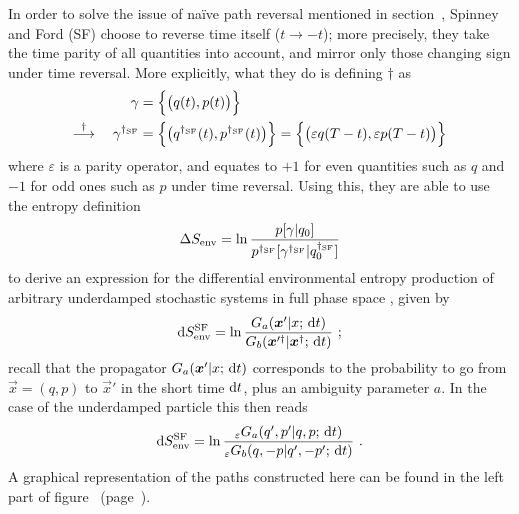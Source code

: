 In order to solve the issue of na\"ive path reversal mentioned in section~, Spinney and Ford (SF) \cite{sf} choose to reverse time itself (\(t\to-t\)); more precisely, they take the time parity of all quantities into account, and mirror only those changing sign under time reversal. More explicitly, what they do is defining \(\dagger\) as \cite{sf-odd-even}
%
\begin{equation}\begin{split}
	\gamma &= \Bigl\{\bigl(q(t),p(t)\bigr)\Bigr\}
	\\ \overset\dagger\longrightarrow \quad
	\gamma^{\dagger_{\text{SF}}}
		&= \Bigl\{\bigl(q^{\dagger_{\text{SF}}}(t),p^{\dagger_{\text{SF}}}(t)\bigr)\Bigr\}
		= \Bigl\{\bigl(\varepsilon q(T-t),\varepsilon p(T-t)\bigr)\Bigr\}
\end{split}\end{equation}
%
where \(\varepsilon\) is a parity operator, and equates to \(+1\) for even quantities such as \(q\) and \(-1\) for odd ones such as \(p\) under time reversal. Using this, they are able to use the entropy definition
%
\begin{equation}
	\Delta S_\text{env} = \ln\frac{p[\gamma | q_0]}{p^{\dagger_{\text{SF}}}[\gamma^{\dagger_{\text{SF}}} | q_0^{\dagger_{\text{SF}}}]}
\end{equation}
%
to derive an expression for the differential environmental entropy production of arbitrary underdamped stochastic systems in full phase space \cite{sf}, given by
%
\begin{equation}
	\mathrm{d}S_\text{env}^{\text{SF}} = \ln \frac{G_a(\boldsymbol{x}'|x;\,\mathrm{d} t)}{G_b(\boldsymbol{x}'^\dagger|\boldsymbol{x}^\dagger;\,\mathrm{d} t)} ~;
\end{equation}
%
recall that the propagator \(G_a(\boldsymbol{x}'|x;\,\mathrm{d} t)\) corresponds to the probability to go from \(\vec x = (q,p)\) to \(\vec x'\) in the short time \(\mathrm{d} t\), plus an ambiguity parameter \(a\). In the case of the underdamped particle  this then reads
%
\begin{equation}
	\label{eqn:DSEnv spinney main definition}
	\mathrm{d}S_\text{env}^{\text{SF}} =
		\ln \frac
			{_\varepsilon G_a(q',p'|q,p;\,\mathrm{d} t)}
			{_\varepsilon G_b(q,-p|q',-p';\,\mathrm{d} t)} ~.
\end{equation}
%
A graphical representation of the paths constructed here can be found in the left part of figure~ (page~\pageref{fig:hf sf}).


